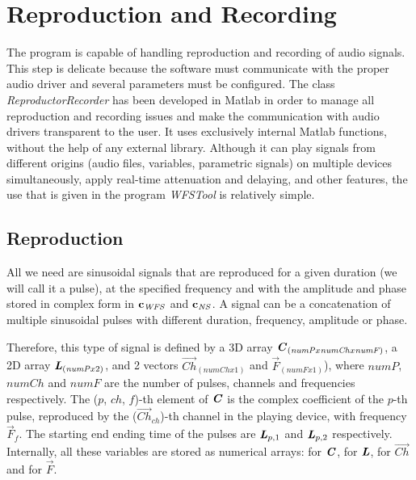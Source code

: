 \section{Reproduction and Recording}
The program is capable of handling reproduction and recording of audio signals. This step is delicate because the software must communicate with the proper audio driver and several parameters must be configured. The class \textit{ReproductorRecorder} has been developed in Matlab in order to manage all reproduction and recording issues and make the communication with audio drivers transparent to the user. It uses exclusively internal Matlab functions, without the help of any external library. Although it can play signals from different origins (audio files, variables, parametric signals) on multiple devices simultaneously, apply real-time attenuation and delaying, and other features, the use that is given in the program \textit{WFSTool} is relatively simple.

\subsection{Reproduction}
All we need are sinusoidal signals that are reproduced for a given duration (we will call it a pulse), at the specified frequency and with the amplitude and phase stored in complex form in $\coef[vec][WFS]$ and $\coef[vec][NS]$. A signal can be a concatenation of multiple sinusoidal pulses with different duration, frequency, amplitude or phase.


Therefore, this type of signal is defined by a 3D array $\bm{\mathit{C}}_{(\mathit{numP} x \mathit{numCh} x \mathit{numF})}$, a 2D array $\bm{\mathit{L}}_{(\mathit{numP} x 2)}$, and 2 vectors $\vec{Ch}_{(\mathit{numCh} x 1)}$ and $\vec{F}_{(\mathit{numF} x 1)}$), where $\mathit{numP}$, $\mathit{numCh}$ and $\mathit{numF}$ are the number of pulses, channels and frequencies respectively. The ($p$, $ch$, $f$)-th element of $\bm{\mathit{C}}$ is the complex coefficient of the $p$-th pulse, reproduced by the ($\vec{Ch}_{\mathit{ch}}$)-th channel in the playing device, with frequency $\vec{F}_f$. The starting end ending time of the pulses are $\bm{\mathit{L}}_{p, 1}$ and $\bm{\mathit{L}}_{p, 2}$ respectively. Internally, all these variables are stored as numerical arrays:  for $\bm{\mathit{C}}$,  for $\bm{\mathit{L}}$,  for $\vec{Ch}$ and  for $\vec{F}$.


